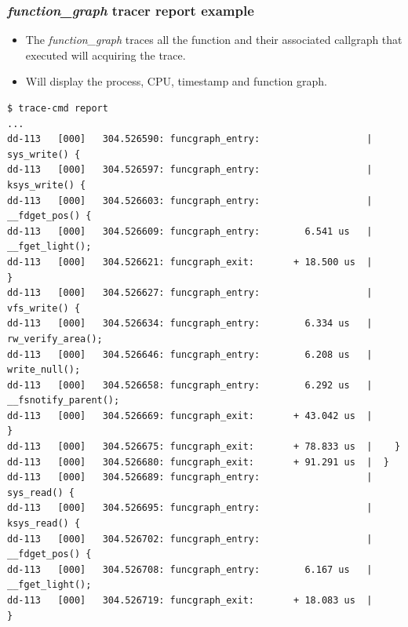 \begin{frame}[fragile]
  \frametitle{{\em function\_graph} tracer report example}
  \begin{itemize}
    \item The {\em function\_graph} traces all the function and their associated
          callgraph that executed will acquiring the trace.
    \item Will display the process, CPU, timestamp and function graph.
  \end{itemize}
  \begin{block}{}
    \begin{verbatim}
$ trace-cmd report
...
dd-113   [000]   304.526590: funcgraph_entry:                   |  sys_write() {
dd-113   [000]   304.526597: funcgraph_entry:                   |    ksys_write() {
dd-113   [000]   304.526603: funcgraph_entry:                   |      __fdget_pos() {
dd-113   [000]   304.526609: funcgraph_entry:        6.541 us   |        __fget_light();
dd-113   [000]   304.526621: funcgraph_exit:       + 18.500 us  |      }
dd-113   [000]   304.526627: funcgraph_entry:                   |      vfs_write() {
dd-113   [000]   304.526634: funcgraph_entry:        6.334 us   |        rw_verify_area();
dd-113   [000]   304.526646: funcgraph_entry:        6.208 us   |        write_null();
dd-113   [000]   304.526658: funcgraph_entry:        6.292 us   |        __fsnotify_parent();
dd-113   [000]   304.526669: funcgraph_exit:       + 43.042 us  |      }
dd-113   [000]   304.526675: funcgraph_exit:       + 78.833 us  |    }
dd-113   [000]   304.526680: funcgraph_exit:       + 91.291 us  |  }
dd-113   [000]   304.526689: funcgraph_entry:                   |  sys_read() {
dd-113   [000]   304.526695: funcgraph_entry:                   |    ksys_read() {
dd-113   [000]   304.526702: funcgraph_entry:                   |      __fdget_pos() {
dd-113   [000]   304.526708: funcgraph_entry:        6.167 us   |        __fget_light();
dd-113   [000]   304.526719: funcgraph_exit:       + 18.083 us  |      }
    \end{verbatim}
  \end{block}
\end{frame}

